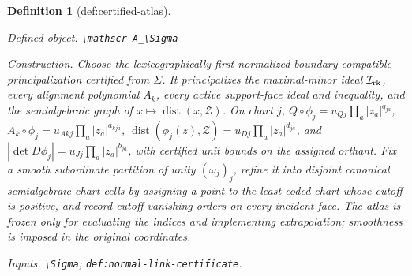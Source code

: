 \documentclass{article}
\newtheorem{definition}{Definition}
\begin{document}
\begin{definition}[def:certified-atlas]\label{def:certified-atlas}
\par\smallskip\noindent\emph{Defined object.} \texttt{\textbackslash{}\allowbreak{}mathscr A\_\allowbreak{}\textbackslash{}\allowbreak{}Sigma}
\par\smallskip\noindent\emph{Construction.} Choose the lexicographically first normalized boundary-compatible principalization certified from \(\Sigma\). It principalizes the maximal-minor ideal \(\mathcal I_{\rm rk}\), every alignment polynomial \(A_k\), every active support-face ideal and inequality, and the semialgebraic graph of \(x\mapsto\operatorname{dist}(x,\mathcal Z)\). On chart \(j\), \(Q\circ\phi_j=u_{Qj}\prod_a|z_a|^{q_{ja}}\), \(A_k\circ\phi_j=u_{Akj}\prod_a|z_a|^{a_{kja}}\), \(\operatorname{dist}(\phi_j(z),\mathcal Z)=u_{Dj}\prod_a|z_a|^{d_{ja}}\), and \(|\det D\phi_j|=u_{Jj}\prod_a|z_a|^{b_{ja}}\), with certified unit bounds on the assigned orthant. Fix a smooth subordinate partition of unity \((\omega_j)_j\), refine it into disjoint canonical semialgebraic chart cells by assigning a point to the least coded chart whose cutoff is positive, and record cutoff vanishing orders on every incident face. The atlas is frozen only for evaluating the indices and implementing extrapolation; smoothness is imposed in the original coordinates.
\par\smallskip\noindent\emph{Inputs.} \texttt{\textbackslash{}\allowbreak{}Sigma}; \texttt{def:\allowbreak{}normal-\allowbreak{}link-\allowbreak{}certificate}.
\end{definition}
\end{document}
